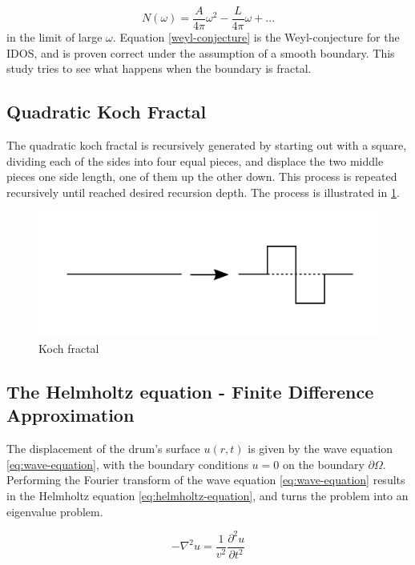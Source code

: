 \documentclass{article}
\begin{document}
\begin{equation}
    \label{eq:weyl-conjecture}
    N(\omega) = \frac{A}{4\pi}\omega^2 - \frac{L}{4\pi}\omega+...
\end{equation}
in the limit of large $\omega$. Equation \ref{weyl-conjecture} is the Weyl-conjecture for the IDOS, and is proven correct under the assumption of a smooth boundary. This study tries to see what happens when the boundary is fractal.

\subsection{Quadratic Koch Fractal}\label{theory-koch}
The quadratic koch fractal is recursively generated by starting out with a square, dividing each of the sides into four equal pieces, and displace the two middle pieces one side length, one of them up the other down. This process is repeated recursively until reached desired recursion depth. The process is illustrated in \ref{generate-koch}.

\begin{figure}[tbp]
    \includegraphics[width=\linewidth, trim={0 3cm 0 3cm}]{./media/koch_frac_step.pdf}
    \caption{Koch fractal}
    \label{generate-koch}
\end{figure}

\subsection{The Helmholtz equation - Finite Difference Approximation}
The displacement of the drum's surface $u(r, t)$ is given by the wave equation \ref{eq:wave-equation}, with the boundary conditions $u = 0$ on the boundary $\partial \Omega$. Performing the Fourier transform of the wave equation \ref{eq:wave-equation} results in the Helmholtz equation \ref{eq:helmholtz-equation}, and turns the problem into an eigenvalue problem.

\begin{equation}
    -\nabla^2u = \frac{1}{v^2}\frac{\partial^2 u}{\partial t^2}
    \label{eq:wave-equation}
\end{equation}
\end{document}
